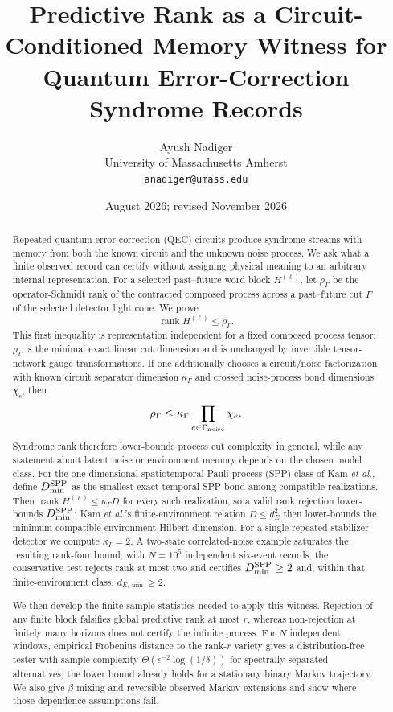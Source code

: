 \documentclass[11pt]{article}
\title{Predictive Rank as a Circuit-Conditioned Memory Witness for Quantum Error-Correction Syndrome Records}
\author{Ayush Nadiger\\University of Massachusetts Amherst\\\texttt{anadiger@umass.edu}}
\date{August 2026; revised November 2026}
\newcommand{\rank}{\operatorname{rank}}
\begin{document}
\maketitle

\begin{abstract}
Repeated quantum-error-correction (QEC) circuits produce syndrome streams with memory from both the known circuit and the unknown noise process. We ask what a finite observed record can certify without assigning physical meaning to an arbitrary internal representation. For a selected past--future word block $H^{(\ell)}$, let $\rho_\Gamma$ be the operator-Schmidt rank of the contracted composed process across a past--future cut $\Gamma$ of the selected detector light cone. We prove
\[
\rank H^{(\ell)}\le \rho_\Gamma.
\]
This first inequality is representation independent for a fixed composed process tensor: $\rho_\Gamma$ is the minimal exact linear cut dimension and is unchanged by invertible tensor-network gauge transformations. If one additionally chooses a circuit/noise factorization with known circuit separator dimension $\kappa_\Gamma$ and crossed noise-process bond dimensions $\chi_e$, then
\[
\rho_\Gamma\le \kappa_\Gamma\prod_{e\in\Gamma_{\rm noise}}\chi_e.
\]
Syndrome rank therefore lower-bounds process cut complexity in general, while any statement about latent noise or environment memory depends on the chosen model class. For the one-dimensional spatiotemporal Pauli-process (SPP) class of Kam \emph{et al.}, define $D_{\min}^{\rm SPP}$ as the smallest exact temporal SPP bond among compatible realizations. Then $\rank H^{(\ell)}\le\kappa_\Gamma D$ for every such realization, so a valid rank rejection lower-bounds $D_{\min}^{\rm SPP}$; Kam \emph{et al.}'s finite-environment relation $D\le d_E^2$ then lower-bounds the minimum compatible environment Hilbert dimension. For a single repeated stabilizer detector we compute $\kappa_\Gamma=2$. A two-state correlated-noise example saturates the resulting rank-four bound; with $N=10^5$ independent six-event records, the conservative test rejects rank at most two and certifies $D_{\min}^{\rm SPP}\ge2$ and, within that finite-environment class, $d_{E,\min}\ge2$.

We then develop the finite-sample statistics needed to apply this witness. Rejection of any finite block falsifies global predictive rank at most $r$, whereas non-rejection at finitely many horizons does not certify the infinite process. For $N$ independent windows, empirical Frobenius distance to the rank-$r$ variety gives a distribution-free tester with sample complexity $\Theta(\epsilon^{-2}\log(1/\delta))$ for spectrally separated alternatives; the lower bound already holds for a stationary binary Markov trajectory. We also give $\beta$-mixing and reversible observed-Markov extensions and show where those dependence assumptions fail.


\end{abstract}
\end{document}
